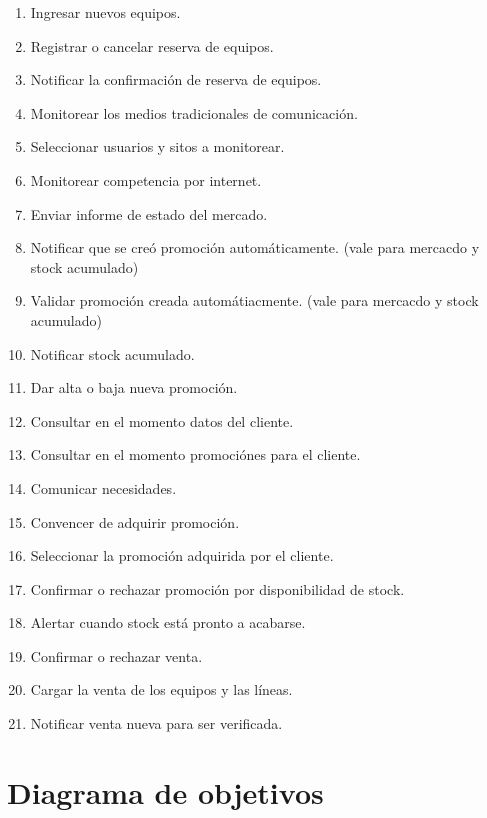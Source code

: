 \begin{enumerate}

  \item Ingresar nuevos equipos.
  \item Registrar o cancelar reserva de equipos.
  \item Notificar la confirmación de reserva de equipos.
  \item Monitorear los medios tradicionales de comunicación.
  \item Seleccionar usuarios y sitos a monitorear.
  \item Monitorear competencia por internet.
  \item Enviar informe de estado del mercado.
  \item Notificar que se creó promoción automáticamente. (vale para mercacdo y stock acumulado)
  \item Validar promoción creada automátiacmente. (vale para mercacdo y stock acumulado)
  \item Notificar stock acumulado.
  \item Dar alta o baja nueva promoción.
  \item Consultar en el momento datos del cliente.
  \item Consultar en el momento promociónes para el cliente.
  \item Comunicar necesidades.
  \item Convencer de adquirir promoción.
  \item Seleccionar la promoción adquirida por el cliente.
  \item Confirmar o rechazar promoción por disponibilidad de stock.
  \item Alertar cuando stock está pronto a acabarse.
  \item Confirmar o rechazar venta.
  \item Cargar la venta de los equipos y las líneas.
  \item Notificar venta nueva para ser verificada.

\end{enumerate}

\clearpage


\section{Diagrama de objetivos}


